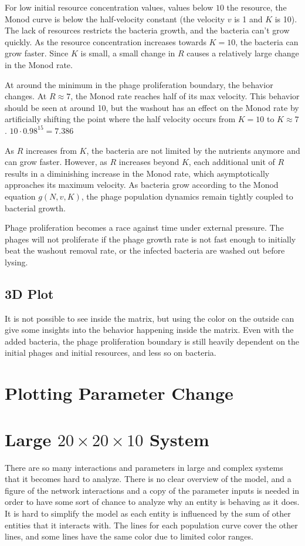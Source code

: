 For low initial resource concentration values, values below $10$ the resource, the Monod curve is below the half-velocity constant (the velocity $v$ is 1 and $K$ is 10). 
The lack of resources restricts the bacteria growth, and the bacteria can't grow quickly. 
As the resource concentration increases towards $K=10$, the bacteria can grow faster. 
Since $K$ is small, a small change in $R$ causes a relatively large change in the Monod rate. 

At around the minimum in the phage proliferation boundary, the behavior changes. 
At $R\approx 7$, the Monod rate reaches half of its max velocity. 
This behavior should be seen at around 10, but the washout has an effect on the Monod rate by artificially shifting the point where the half velocity occurs from $K=10$ to $K\approx 7$. 
$10\cdot 0.98^{15} = 7.386$



As $R$ increases from $K$, the bacteria are not limited by the nutrients anymore and can grow faster. 
However, as $R$ increases beyond $K$, each additional unit of $R$ results in a diminishing increase in the Monod rate, which asymptotically approaches its maximum velocity. 
As bacteria grow according to the Monod equation $g(N, v, K)$, the phage population dynamics remain tightly coupled to bacterial growth. 

Phage proliferation becomes a race against time under external pressure. 
The phages will not proliferate if the phage growth rate is not fast enough to initially beat the washout removal rate, or the infected bacteria are washed out before lysing. 

\subsection{3D Plot}
It is not possible to see inside the matrix, but using the color on the outside can give some insights into the behavior happening inside the matrix. 
Even with the added bacteria, the phage proliferation boundary is still heavily dependent on the initial phages and initial resources, and less so on bacteria. 

\section{Plotting Parameter Change}

\section{Large $20\times20\times10$ System}
There are so many interactions and parameters in large and complex systems that it becomes hard to analyze. 
There is no clear overview of the model, and a figure of the network interactions and a copy of the parameter inputs is needed in order to have some sort of chance to analyze why an entity is behaving as it does. 
It is hard to simplify the model as each entity is influenced by the sum of other entities that it interacts with. 
The lines for each population curve cover the other lines, and some lines have the same color due to limited color ranges. 


